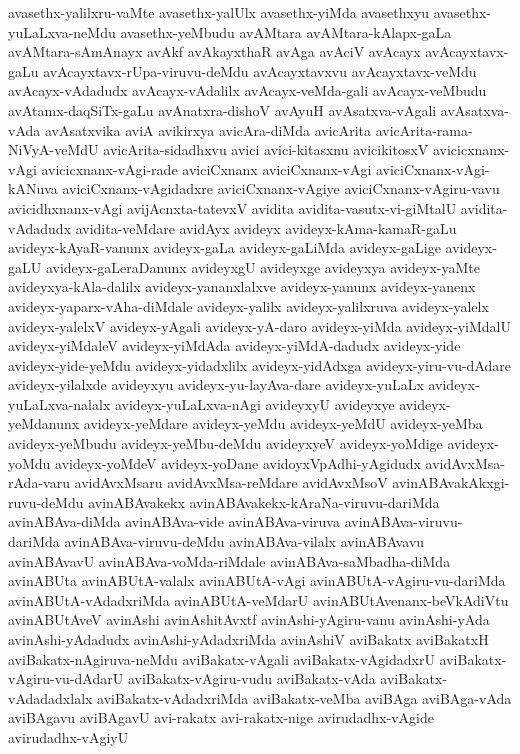 {avasethx-yalilxru-vaMte
avasethx-yalUlx
avasethx-yiMda
avasethxyu
avasethx-yuLaLxva-neMdu
avasethx-yeMbudu
avAMtara
avAMtara-kAlapx-gaLa
avAMtara-sAmAnayx
avAkf
avAkayxthaR
avAga
avAciV
avAcayx
avAcayxtavx-gaLu
avAcayxtavx-rUpa-viruvu-deMdu
avAcayxtavxvu
avAcayxtavx-veMdu
avAcayx-vAdadudx
avAcayx-vAdalilx
avAcayx-veMda-gali
avAcayx-veMbudu
avAtamx-daqSiTx-gaLu
avAnatxra-dishoV
avAyuH
avAsatxva-vAgali
avAsatxva-vAda
avAsatxvika
aviA
avikirxya
avicAra-diMda
avicArita
avicArita-rama-NiVyA-veMdU
avicArita-sidadhxvu
avici
avici-kitasxnu
avicikitosxV
avicicxnanx-vAgi
avicicxnanx-vAgi-rade
aviciCxnanx
aviciCxnanx-vAgi
aviciCxnanx-vAgi-kANuva
aviciCxnanx-vAgidadxre
aviciCxnanx-vAgiye
aviciCxnanx-vAgiru-vavu
avicidhxnanx-vAgi
avijAcnxta-tatevxV
avidita
avidita-vasutx-vi-giMtalU
avidita-vAdadudx
avidita-veMdare
avidAyx
avideyx
avideyx-kAma-kamaR-gaLu
avideyx-kAyaR-vanunx
avideyx-gaLa
avideyx-gaLiMda
avideyx-gaLige
avideyx-gaLU
avideyx-gaLeraDanunx
avideyxgU
avideyxge
avideyxya
avideyx-yaMte
avideyxya-kAla-dalilx
avideyx-yananxlalxve
avideyx-yanunx
avideyx-yanenx
avideyx-yaparx-vAha-diMdale
avideyx-yalilx
avideyx-yalilxruva
avideyx-yalelx
avideyx-yalelxV
avideyx-yAgali
avideyx-yA-daro
avideyx-yiMda
avideyx-yiMdalU
avideyx-yiMdaleV
avideyx-yiMdAda
avideyx-yiMdA-dadudx
avideyx-yide
avideyx-yide-yeMdu
avideyx-yidadxlilx
avideyx-yidAdxga
avideyx-yiru-vu-dAdare
avideyx-yilalxde
avideyxyu
avideyx-yu-layAva-dare
avideyx-yuLaLx
avideyx-yuLaLxva-nalalx
avideyx-yuLaLxva-nAgi
avideyxyU
avideyxye
avideyx-yeMdanunx
avideyx-yeMdare
avideyx-yeMdu
avideyx-yeMdU
avideyx-yeMba
avideyx-yeMbudu
avideyx-yeMbu-deMdu
avideyxyeV
avideyx-yoMdige
avideyx-yoMdu
avideyx-yoMdeV
avideyx-yoDane
avidoyxVpAdhi-yAgidudx
avidAvxMsa-rAda-varu
avidAvxMsaru
avidAvxMsa-reMdare
avidAvxMsoV
avinABAvakAkxgi-ruvu-deMdu
avinABAvakekx
avinABAvakekx-kAraNa-viruvu-dariMda
avinABAva-diMda
avinABAva-vide
avinABAva-viruva
avinABAva-viruvu-dariMda
avinABAva-viruvu-deMdu
avinABAva-vilalx
avinABAvavu
avinABAvavU
avinABAva-voMda-riMdale
avinABAva-saMbadha-diMda
avinABUta
avinABUtA-valalx
avinABUtA-vAgi
avinABUtA-vAgiru-vu-dariMda
avinABUtA-vAdadxriMda
avinABUtA-veMdarU
avinABUtAvenanx-beVkAdiVtu
avinABUtAveV
avinAshi
avinAshitAvxtf
avinAshi-yAgiru-vanu
avinAshi-yAda
avinAshi-yAdadudx
avinAshi-yAdadxriMda
avinAshiV
aviBakatx
aviBakatxH
aviBakatx-nAgiruva-neMdu
aviBakatx-vAgali
aviBakatx-vAgidadxrU
aviBakatx-vAgiru-vu-dAdarU
aviBakatx-vAgiru-vudu
aviBakatx-vAda
aviBakatx-vAdadadxlalx
aviBakatx-vAdadxriMda
aviBakatx-veMba
aviBAga
aviBAga-vAda
aviBAgavu
aviBAgavU
avi-rakatx
avi-rakatx-nige
avirudadhx-vAgide
avirudadhx-vAgiyU
}
